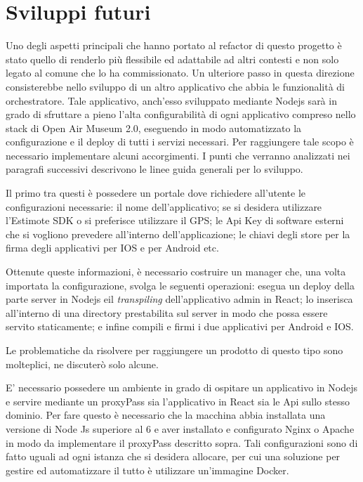 \chapter{Sviluppi futuri}
\label{cha:intro}
\vspace{5mm}

Uno degli aspetti principali che hanno portato al refactor di questo progetto è stato quello di renderlo più flessibile ed adattabile ad altri contesti e non solo legato al comune che lo ha commissionato. Un ulteriore passo in questa direzione consisterebbe nello sviluppo di un altro applicativo che abbia le funzionalità di orchestratore. Tale applicativo, anch'esso sviluppato mediante Nodejs sarà in grado di sfruttare a pieno l’alta configurabilità di ogni applicativo compreso nello stack di Open Air Museum 2.0, eseguendo in modo automatizzato la configurazione e il deploy di tutti i servizi necessari. Per raggiungere tale scopo è necessario implementare alcuni accorgimenti. I punti che verranno analizzati nei paragrafi successivi descrivono le linee guida generali per lo sviluppo.\vspace{5mm}

Il primo tra questi è possedere un portale dove richiedere all’utente le configurazioni necessarie: il nome dell’applicativo; se si desidera utilizzare l’Estimote SDK o si preferisce utilizzare il GPS; le Api Key di software esterni che si vogliono prevedere all'interno dell'applicazione; le chiavi degli store per la firma degli applicativi per IOS e per Android etc.\vspace{5mm}

Ottenute queste informazioni, è necessario costruire un manager che, una volta importata la configurazione, svolga le seguenti operazioni: esegua un deploy della parte server in Nodejs eil \emph{transpiling} dell'applicativo admin in React; lo inserisca all’interno di una directory prestabilita sul server in modo che possa essere servito staticamente; e infine compili e firmi i due applicativi per Android e IOS. \vspace{5mm}

Le problematiche da risolvere per raggiungere un prodotto di questo tipo sono molteplici, ne discuterò solo alcune.\vspace{5mm}

E’ necessario possedere un ambiente in grado di ospitare un applicativo in Nodejs e servire mediante un proxyPass sia l’applicativo in React sia le Api sullo stesso dominio. Per fare questo è necessario che la macchina abbia installata una versione di Node Js superiore al 6 e aver installato e configurato Nginx o Apache in modo da implementare il proxyPass descritto sopra. Tali configurazioni sono di fatto uguali ad ogni istanza che si desidera allocare, per cui una soluzione per gestire ed automatizzare il tutto è utilizzare un'immagine Docker.\vspace{5mm}

